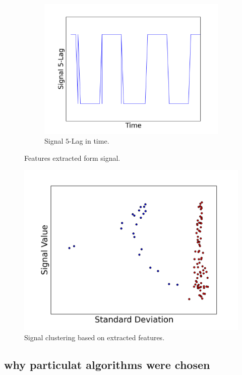 \documentclass[11pt, letterpaper]{article}            %
\begin{document}
\begin{figure}[htbp]
  ~ %
  \begin{subfigure}[b]{0.4\textwidth}
    \includegraphics[width=\textwidth]{./gfx/feature3-1.png}
    \caption{Signal $5$-Lag in time.\label{fig:lag}}
  \end{subfigure}
  \caption{Features extracted form signal.\label{fig:features}}
\end{figure}

\begin{figure}[htbp]
  \centering
  \includegraphics[width=.7\textwidth]{./gfx/f2f5.png}
  \caption{Signal clustering based on extracted features.\label{fig:clustering}}
\end{figure}

\subsection{why particulat algorithms were chosen}
\end{document}
